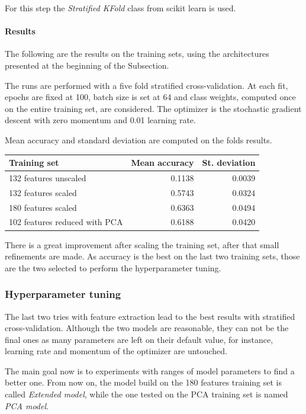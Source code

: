 For this step the \emph{Stratified KFold} class from scikit learn is used.~\cite{cross-scikit}

\paragraph{Results}
The following are the results on the training sets, using the architectures 
presented at the beginning of the Subsection. 

The runs are performed with a five fold stratified cross-validation. 
At each fit, epochs are fixed at 100, 
batch size is set at 64 and class weights, computed once on 
the entire training set, are considered. 
The optimizer is the stochastic gradient descent with zero momentum and 
0.01 learning rate. 

Mean accuracy and standard deviation are computed on the 
folds results.
\begin{center}
    \begin{tabular}{ |l|r|r| } 
        \hline
        Training set & Mean accuracy & St. deviation \\
        \hline
        132 features unscaled &  0.1138 & 0.0039 \\
        132 features scaled &  0.5743 & 0.0324 \\
        180 features scaled &  0.6363 & 0.0494 \\
        102 features reduced with PCA &  0.6188 & 0.0420 \\
        \hline
    \end{tabular}
\end{center}

There is a great improvement after scaling the training set, after 
that small refinements are made.
As accuracy is the best on the last two training sets, those are the two selected to 
perform the hyperparameter tuning.

\subsubsection{Hyperparameter tuning}

The last two tries with feature extraction lead to the best results 
with stratified cross-validation. Although the two models are reasonable, 
they can not be the final ones as many parameters are left on their default value, 
for instance, learning rate and momentum of the optimizer are untouched. 

The main goal now is to experiments with ranges of model parameters 
to find a better one. From now on, the model build on the 180 features training set is 
called \emph{Extended model}, 
while the one tested on the PCA training set is named \emph{PCA model}.

